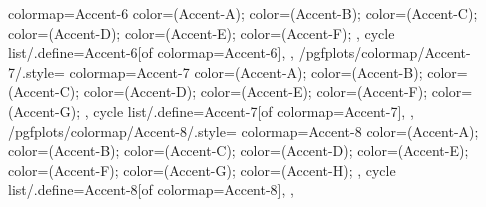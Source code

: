 {{    colormap={Accent-6}{
      color=(Accent-A);
      color=(Accent-B);
      color=(Accent-C);
      color=(Accent-D);
      color=(Accent-E);
      color=(Accent-F);
    },
    cycle list/.define={Accent-6}{[of colormap=Accent-6]},
  },
  /pgfplots/colormap/Accent-7/.style={
    colormap={Accent-7}{
      color=(Accent-A);
      color=(Accent-B);
      color=(Accent-C);
      color=(Accent-D);
      color=(Accent-E);
      color=(Accent-F);
      color=(Accent-G);
    },
    cycle list/.define={Accent-7}{[of colormap=Accent-7]},
  },
  /pgfplots/colormap/Accent-8/.style={
    colormap={Accent-8}{
      color=(Accent-A);
      color=(Accent-B);
      color=(Accent-C);
      color=(Accent-D);
      color=(Accent-E);
      color=(Accent-F);
      color=(Accent-G);
      color=(Accent-H);
    },
    cycle list/.define={Accent-8}{[of colormap=Accent-8]},
  },
}

